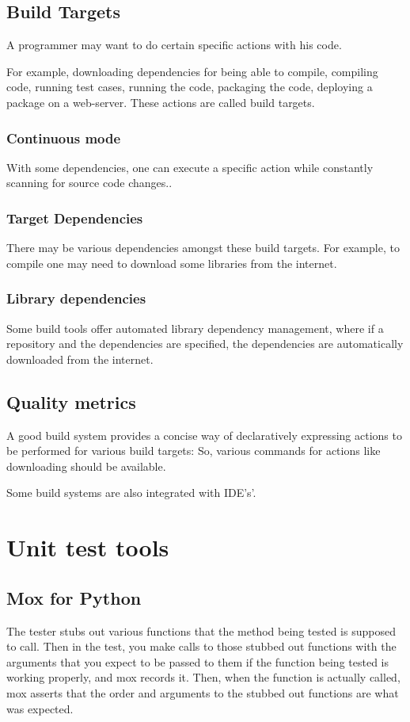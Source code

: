 \section{Build Targets}
A programmer may want to do certain specific actions with his code.

For example, downloading dependencies for being able to compile, compiling code, running test cases, running the code, packaging the code, deploying a package on a web-server. These actions are called build targets.

\subsection{Continuous mode}
With some dependencies, one can execute a specific action while constantly scanning for source code changes..

\subsection{Target Dependencies}
There may be various dependencies amongst these build targets. For example, to compile one may need to download some libraries from the internet.

\subsection{Library dependencies}
Some build tools offer automated library dependency management, where if a repository and the dependencies are specified, the dependencies are automatically downloaded from the internet.

\section{Quality metrics}
A good build system provides a concise way of declaratively expressing actions to be performed for various build targets: So, various commands for actions like downloading should be available.

Some build systems are also integrated with IDE's'.

\chapter{Unit test tools}
\section{Mox for Python}
The tester stubs out various functions that the method being tested is supposed to call. Then in the test, you make calls to those stubbed out functions with the arguments that you expect to be passed to them if the function being tested is working properly, and mox records it. Then, when the function is actually called, mox asserts that the order and arguments to the stubbed out functions are what was expected.



